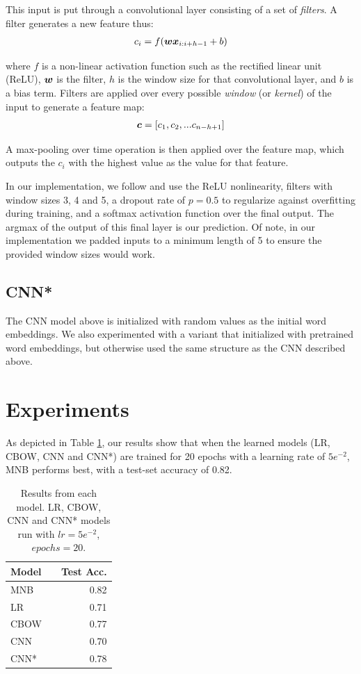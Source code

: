 \documentclass[11pt]{article}
\begin{document}
This input is put through a convolutional layer consisting of a set of \textit{filters}. A filter generates a new feature thus:
\begin{align}
  c_i = f(\boldsymbol{w}\boldsymbol{x}_{i:i+h-1} + b)
\end{align}

where $f$ is a non-linear activation function such as the rectified linear unit (ReLU), $\boldsymbol{w}$ is the filter, $h$ is the window size for that convolutional layer, and $b$ is a bias term. Filters are applied over every possible \textit{window} (or \textit{kernel}) of the input to generate a feature map:
\begin{align}
  \boldsymbol{c} = [c_1, c_2, ... c_{n-h+1}]
\end{align}

A max-pooling over time operation is then applied over the feature map, which outputs the $c_i$ with the highest value as the value for that feature.

In our implementation, we follow \cite{kim2014convolutional} and use the ReLU nonlinearity, filters with window sizes 3, 4 and 5, a dropout rate of $p=0.5$ to regularize against overfitting during training, and a softmax activation function over the final output. The argmax of the output of this final layer is our prediction. Of note, in our implementation we padded inputs to a minimum length of 5 to ensure the provided window sizes would work.

\subsection{CNN*}

The CNN model above is initialized with random values as the initial word embeddings. We also experimented with a variant that initialized with pretrained word embeddings, but otherwise used the same structure as the CNN described above. 

\section{Experiments}

As depicted in Table \ref{tab:results}, our results show that when the learned models (LR, CBOW, CNN and CNN*) are trained for 20 epochs with a learning rate of $5e^{-2}$, MNB performs best, with a test-set accuracy of 0.82.

\begin{table}[h]
  \centering
  \begin{tabular}{llr}
   \toprule
   Model &  & Test Acc. \\
   \midrule
   \textsc{MNB} & & 0.82\\
   \textsc{LR} & & 0.71\\
   \textsc{CBOW} & & 0.77 \\
   \textsc{CNN} & & 0.70 \\
   \textsc{CNN*} & & 0.78 \\
   \bottomrule
  \end{tabular}
  \caption{\label{tab:results} Results from each model. LR, CBOW, CNN and CNN* models run with $lr=5e^{-2}$, $epochs=20$.}
  \end{table}
\end{document}
